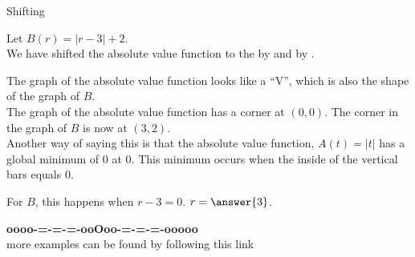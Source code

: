 \documentclass{ximera}
\begin{document}
\begin{example}  Shifting

Let $B(r) = |r-3| + 2$.  \\


We have shifted the absolute value function to the  by  and   by .


\begin{image}
\end{image}




The graph of the absolute value function looks like a ``V'', which is also the shape of the graph of $B$. \\


The graph of the absolute value function has a corner at $(0, 0)$.  The corner in the graph of $B$ is now at $(3, 2)$. \\

Another way of saying this is that the absolute value function, $A(t) = |t|$ has a global minimum of $0$ at $0$.  This minimum occurs when the inside of the vertical bars equals $0$.

For $B$, this happens when $r-3=0$. $r=\answer{3}$.



\end{example}

































\begin{center}
\textbf{\textcolor{green!50!black}{oooo-=-=-=-ooOoo-=-=-=-ooooo}} \\

more examples can be found by following this link\\ 

\end{center}
\end{document}
